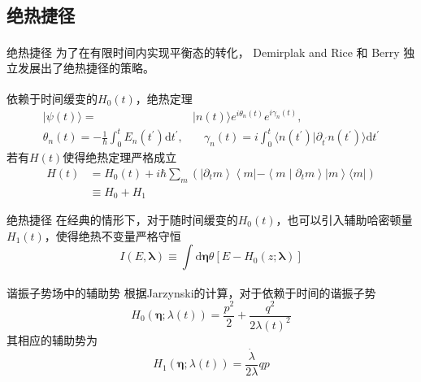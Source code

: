 \documentclass{beamer}
\newcommand{\upcite}[1]{\textsuperscript{\cite{#1}}}  %
\newcommand{\M}[1]{\mathrm{#1}}
\begin{document}
\subsection{绝热捷径}
\begin{frame}{绝热捷径}
为了在有限时间内实现平衡态的转化， Demirplak and Rice \upcite{Demirplak2003}和 Berry \upcite{Berry2009} 独立发展出了绝热捷径的策略。
\pause

依赖于时间缓变的$H_0(t)$，绝热定理\upcite{Griffiths2018}
\begin{equation}
\begin{split}
    |\psi(t)\rangle=&|n(t)\rangle e^{i \theta_{n}(t)} e^{i \gamma_{n}(t)},\\
    \theta_{n}(t)=-\frac{1}{\hbar} \int_{0}^{t} E_{n}(t^{\prime}) \M{d} t^{\prime},& \quad \gamma_{n}(t)=i \int_{0}^{t}\langle n(t^{\prime}) | \partial_{t^{\prime}}n(t^{\prime})\rangle \M{d} t^{\prime}            
\end{split}        
    \label{eq9}
\end{equation}
\pause
若有$H(t)$使得绝热定理严格成立
\pause
\begin{equation}
\begin{split}
    H(t)&=H_{0}(t)+i \hbar \sum_{m}\left(\left|\partial_{t} m\right\rangle\left\langle m\left|-\left\langle m \mid \partial_{t} m\right\rangle\right| m\right\rangle\langle m|\right) \\
    &\equiv H_0 + H_1
\end{split}
    \label{eq10}
\end{equation}
\end{frame}

\begin{frame}{绝热捷径}
    在经典的情形下，对于随时间缓变的$H_0 (t)$，也可以引入辅助哈密顿量$H_1 (t)$，使得绝热不变量严格守恒
        \begin{equation}
            I(E, \boldsymbol{\lambda}) \equiv \int \mathrm{d} \bm{\eta} \theta\left[E-H_{0}(z ; \boldsymbol{\lambda})\right]
          \label{eq11}
        \end{equation}
        \pause
    \begin{alertblock}{谐振子势场中的辅助势}
        根据Jarzynski的计算\upcite{Jarzynski2013}，对于依赖于时间的谐振子势
        \begin{equation}
            H_{0}(\bm{\eta} ; \lambda(t))=\frac{p^{2}}{2}+\frac{q^2}{2\lambda(t)^{2}}
            \label{eq12}
        \end{equation}
        \pause
        其相应的辅助势为
        \begin{equation}
            H_{1}(\bm{\eta} ; \lambda(t))=\frac{\dot{\lambda}}{2 \lambda} q p
            \label{eq13}
        \end{equation}
    \end{alertblock}
\end{frame}
\end{document}
